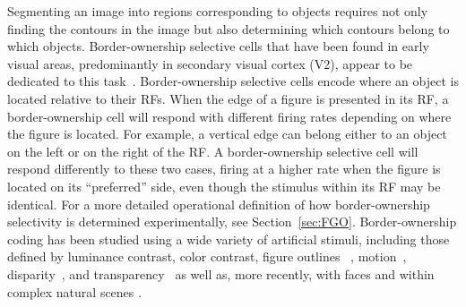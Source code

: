 Segmenting an image into regions corresponding to objects requires not only finding the contours in the image but also determining which contours belong to which objects.
%
Border-ownership selective cells that have been found in early visual
areas, predominantly in secondary visual cortex (V2), appear to be
dedicated to this task~\citep{Zhou_etal00}. Border-ownership selective cells encode where an object is located relative to their RFs.  When the edge of a figure is presented in its RF, a border-ownership cell will respond with different firing rates depending on where the figure is located.  For example, a vertical edge can belong either to an object on the left or on the right of the RF. A border-ownership selective cell will respond differently to these two cases, firing at a higher rate when the figure is located on its ``preferred'' side, even though the stimulus within its RF may be identical. For a more detailed operational definition of how border-ownership selectivity is determined experimentally, see Section~\ref{sec:FGO}. Border-ownership coding has been studied using a wide variety of artificial stimuli, including those defined by luminance contrast, color contrast, figure outlines ~\citep{Zhou_etal00},
motion~\citep{vonderHeydt_etal03a}, disparity~\citep{Zhou_etal00,Qiu_vonderHeydt05}, and
transparency~\citep{Qiu_vonderHeydt07} as well as, more recently, with
faces \citep{Hesse_Tsao16} and within complex natural scenes
\citep{Williford_vonderHeydt14}.


